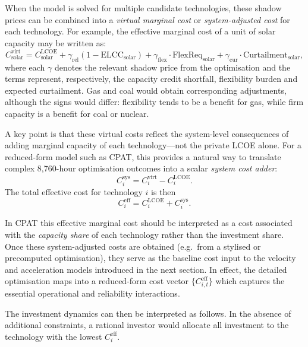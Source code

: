 \documentclass[preprint,authoryear,12pt]{elsarticle}
\begin{document}
When the model is solved for multiple candidate technologies, these shadow prices can be
combined into a \emph{virtual marginal cost} or \emph{system-adjusted cost} for each technology.
For example, the effective marginal cost of a unit of solar capacity may be written as:
\begin{equation}
    C^{\text{virt}}_{\text{solar}}
    = C^{\text{LCOE}}_{\text{solar}}
      + \gamma_{\text{rel}} \left(1 - \text{ELCC}_{\text{solar}}\right)
      + \gamma_{\text{flex}} \cdot \text{FlexReq}_{\text{solar}}
      + \gamma_{\text{cur}} \cdot \text{Curtailment}_{\text{solar}},
\end{equation}
where each $\gamma$ denotes the relevant shadow price from the optimisation and the terms
represent, respectively, the capacity credit shortfall, flexibility burden and expected curtailment.
Gas and coal would obtain corresponding adjustments, although the signs would differ:
flexibility tends to be a benefit for gas, while firm capacity is a benefit for coal or nuclear.

A key point is that these virtual costs reflect the system-level consequences of adding marginal
capacity of each technology—not the private LCOE alone. For a reduced-form model such as
CPAT, this provides a natural way to translate complex 8,760-hour optimisation outcomes into a
scalar \emph{system cost adder}:
\begin{equation}
    C_{i}^{\text{sys}} = C_{i}^{\text{virt}} - C_{i}^{\text{LCOE}}.
\end{equation}
The total effective cost for technology $i$ is then
\begin{equation}
    C_{i}^{\text{eff}} = C_{i}^{\text{LCOE}} + C_{i}^{\text{sys}}.
\end{equation}

In CPAT this effective marginal cost should be interpreted as a cost associated with the
\emph{capacity share} of each technology rather than the investment share. Once these
system-adjusted costs are obtained (e.g.~from a stylised or precomputed optimisation), they
serve as the baseline cost input to the velocity and acceleration models introduced in the next
section. In effect, the detailed optimisation maps into a reduced-form cost vector
$\{C_{i,t}^{\text{eff}}\}$ which captures the essential operational and reliability interactions.

The investment dynamics can then be interpreted as follows. In the absence of additional
constraints, a rational investor would allocate all investment to the technology with the lowest
$C_{i}^{\text{eff}}$. 
\end{document}
